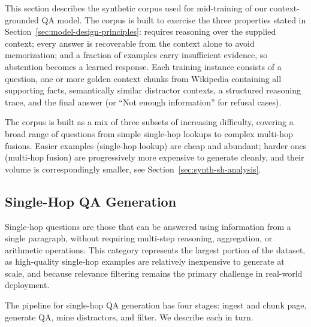 \label{sec:training-data}

This section describes the synthetic corpus used for mid-training of our context-grounded QA model. The corpus is built to exercise the three properties stated in Section~\ref{sec:model-design-principles}: requires reasoning over the supplied context; every answer is recoverable from the context alone to avoid memorization; and a fraction of examples carry insufficient evidence, so abstention becomes a learned response. Each training instance consists of a question, one or more golden context chunks from Wikipedia containing all supporting facts, semantically similar distractor contexts, a structured reasoning trace, and the final answer (or ``Not enough information'' for refusal cases).

The corpus is built as a mix of three subsets of increasing difficulty, covering a broad range of questions from simple single-hop lookups to complex multi-hop fusions. Easier examples (single-hop lookup) are cheap and abundant; harder ones (multi-hop fusion) are progressively more expensive to generate cleanly, and their volume is correspondingly smaller, see Section~\ref{sec:synth-sh-analysis}. 

\subsection{Single-Hop QA Generation}
\label{sec:synth-singlehop}
Single-hop questions are those that can be answered using information from a single paragraph, without requiring multi-step reasoning, aggregation, or arithmetic operations. This category represents the largest portion of the dataset, as high-quality single-hop examples are relatively inexpensive to generate at scale, and because relevance filtering remains the primary challenge in real-world deployment.

The pipeline for single-hop QA generation has four stages: ingest and chunk page, generate QA, mine distractors, and filter. We describe each in turn.

